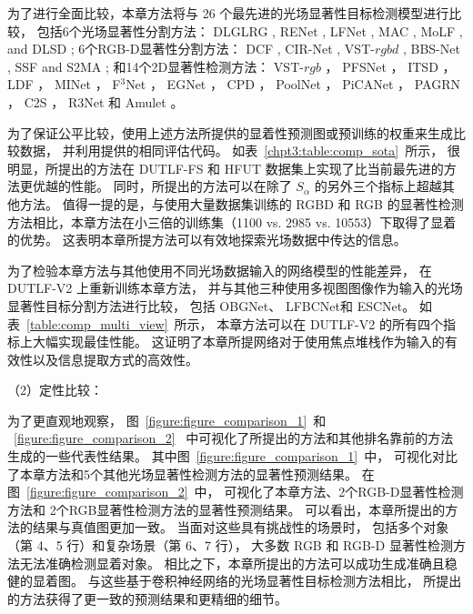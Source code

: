 为了进行全面比较，本章方法将与 26 个最先进的光场显著性目标检测模型进行比较，
包括6个光场显著性分割方法：
DLGLRG , RENet , LFNet ,
MAC , MoLF , and DLSD ;
%
%
%
%
6个RGB-D显著性分割方法：
DCF , CIR-Net , VST-$rgbd$  ,
BBS-Net     , SSF      and S2MA    ;
%
%
%
%
%
和14个2D显著性检测方法：
VST-$rgb$ ，
PFSNet ，
ITSD ，
LDF ，
MINet ，
F$^{3}$Net  ， 
EGNet   ，
CPD  ，
PoolNet ，
PiCANet ，
PAGRN ，
C2S   ，
R3Net  
和
Amulet 。






为了保证公平比较，使用上述方法所提供的显着性预测图或预训练的权重来生成比较数据，
并利用提供的相同评估代码。
如表~\ref{chpt3:table:comp_sota}~所示，
很明显，所提出的方法在 DUTLF-FS 和 HFUT 数据集上实现了比当前最先进的方法更优越的性能。 同时，所提出的方法可以在除了 $ S_{\alpha} $ 的另外三个指标上超越其他方法。 值得一提的是，与使用大量数据集训练的 RGBD 和 RGB 的显著性检测方法相比，本章方法在小三倍的训练集（1100 vs. 2985 vs. 10553）下取得了显着的优势。 
这表明本章所提方法可以有效地探索光场数据中传达的信息。 



为了检验本章方法与其他使用不同光场数据输入的网络模型的性能差异，
在 DUTLF-V2 上重新训练本章方法，
并与其他三种使用多视图图像作为输入的光场显著性目标分割方法进行比较，
包括 OBGNet、
LFBCNet和
ESCNet。 
如表~\ref{table:comp_multi_view}~所示，
本章方法可以在 DUTLF-V2 的所有四个指标上大幅实现最佳性能。 
这证明了本章所提网络对于使用焦点堆栈作为输入的有效性以及信息提取方式的高效性。 






（2）定性比较：


为了更直观地观察，
图~\ref{figure:figure_comparison_1}~和
~\ref{figure:figure_comparison_2}~
中可视化了所提出的方法和其他排名靠前的方法生成的一些代表性结果。
其中图~\ref{figure:figure_comparison_1}~中，
可视化对比了本章方法和5个其他光场显著性检测方法的显著性预测结果。
在图~\ref{figure:figure_comparison_2}~中，
可视化了本章方法、2个RGB-D显著性检测方法和
2个RGB显著性检测方法的显著性预测结果。
可以看出，本章所提出的方法的结果与真值图更加一致。 
当面对这些具有挑战性的场景时，
包括多个对象（第 4、5 行）和复杂场景（第 6、7 行），
大多数 RGB 和 RGB-D 显著性检测方法无法准确检测显着对象。
相比之下，本章所提出的方法可以成功生成准确且稳健的显着图。
与这些基于卷积神经网络的光场显著性目标检测方法相比，
所提出的方法获得了更一致的预测结果和更精细的细节。




